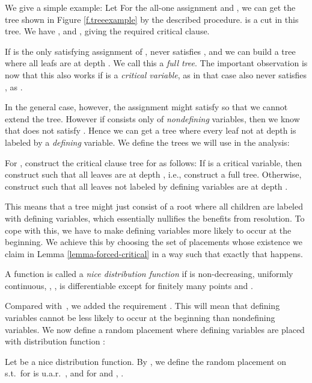 We give a simple example: Let  For the all-one assignment and , we can get the tree shown in Figure \ref{f.treeexample} by the described procedure.  is a cut in this tree. We have ,  and , giving the required critical clause.

If  is the only satisfying assignment of , 
never satisfies , and we can build a tree where all leafs are at
depth . We call this a {\em full tree}. The
important observation is now that this also works if  is a
\emph{critical variable}, as in that case  also never
satisfies , as .

In the general case, however, the assignment  might satisfy  so that we cannot extend the tree. However if  consists only of \emph{nondefining} variables, then we know that  does not satisfy . Hence we can get a tree where every leaf not at depth  is labeled by a \emph{defining} variable. We define the trees  we will use in the analysis:
\begin{definition}
\label{p.d.trees}
For , construct the critical clause tree for  as
follows: If  is a critical variable, then construct  such that
all leaves are at depth , i.e., construct a full tree. Otherwise,
construct  such that all leaves not labeled by defining variables
are at depth .
\end{definition}

This means that a tree might just consist of a root where all children are labeled with defining variables, which essentially nullifies the benefits from resolution. To cope with this, we have to make defining variables more likely to occur at the beginning. We achieve this by choosing the set  of placements whose existence we claim in Lemma \ref{lemma-forced-critical} in a way such that exactly that happens. 

\begin{definition}
  A function  is called a \emph{nice distribution
    function} if  is non-decreasing, uniformly continuous,
  , ,  is differentiable except for finitely many
  points and .
\end{definition}
Compared with~\cite{ppsz}, we added the requirement . This will
mean that defining variables cannot be less likely to occur at the
beginning than nondefining variables. We now define a random placement where defining
variables are placed with distribution function :
\begin{definition}
  Let  be a nice distribution function. By , we define the
  random placement on  s.t.\  for  is u.a.r.\
  , and for  and , .
  \label{nice-random-placement}
\end{definition}

